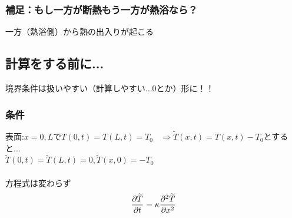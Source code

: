 \documentclass[titlepage,dvipdfmx]{jsarticle}
\begin{document}
\subsubsection*{補足：もし一方が断熱もう一方が熱浴なら？}
一方（熱浴側）から熱の出入りが起こる
\subsection{計算をする前に...}
境界条件は扱いやすい（計算しやすい...0とか）形に！！
\subsubsection*{条件} \noindent
表面:$x=0,L$で$T(0,t)=T(L,t)=T_0~~~~\Rightarrow \widetilde{T}(x,t)=T(x,t)-T_0$とすると...\\
$\widetilde{T}(0,t)=\widetilde{T}(L,t)=0,\widetilde{T}(x,0)=-T_0$\\\\
方程式は変わらず
\begin{equation}\displaystyle
\displaystyle \frac{\partial \widetilde{T}}{\partial t}=\kappa  \frac{\partial^2 \widetilde{T}}{\partial x^2} \nonumber
\end{equation}
\end{document}
